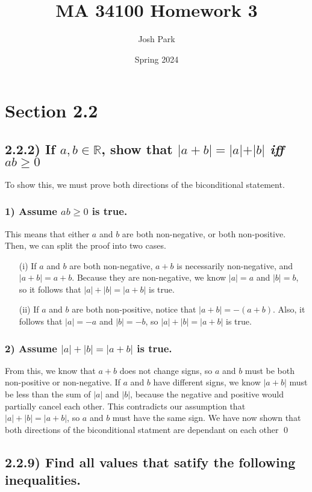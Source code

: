 \documentclass[11pt]{article}
\author{Josh Park}
\date{Spring 2024}
\title{MA 34100 Homework 3}
\newcommand{\R}{\mathbb{R}}    %
\begin{document}
\setlength{\parindent}{0pt}
\maketitle
\section*{Section 2.2}
\subsection*{2.2.2) If $a, b \in \R$, show that $\vert a+ b \vert = \vert a \vert + \vert b \vert$ \emph{iff} $ab \geq{ 0}$}
    To show this, we must prove both directions of the biconditional statement.
    \subsubsection*{1) Assume $ab \geq 0$ is true.}
    This means that either $a$ and $b$ are both non-negative, or both non-positive. Then, we can split the proof into two cases.
    \begin{enumerate}
        \item[(i)] If $a$ and $b$ are both non-negative, $a+b$ is necessarily non-negative, and $\vert a+b \vert = a+b$. Because they are non-negative, we know $|a|=a$ and $|b|=b$, so it follows that $|a|+|b| = |a+b|$ is true.

        \item[(ii)] If $a$ and $b$ are both non-positive, notice that $\vert a+b \vert = -(a+b)$. Also, it follows that $|a|=-a$ and $|b|=-b$, so $|a|+|b| = |a+b|$ is true.
    \end{enumerate}
    \subsubsection*{2) Assume $|a|+|b| = |a+b|$ is true.}
    From this, we know that $a+b$ does not change signs, so $a$ and $b$ must be both non-positive or non-negative. If $a$ and $b$ have different signs, we know $|a+b|$ must be less than the sum of $|a|$ and $|b|$, because the negative and positive would partially cancel each other. This contradicts our assumption that $|a|+|b| = |a+b|$, so $a$ and $b$ must have the same sign. We have now shown that both directions of the biconditional statment are dependant on each other \qed

\subsection*{2.2.9) Find all values that satify the following inequalities.}
\end{document}
